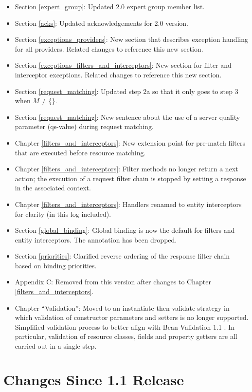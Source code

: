 \begin{itemize}
\item Section \ref{expert_group}: Updated 2.0 expert group member list.
\item Section \ref{acks}: Updated acknowledgements for 2.0 version.
\item Section \ref{exceptions_providers}: New section that describes exception handling for all providers. Related changes to reference this new section.
\item Section \ref{exceptions_filters_and_interceptors}: New section for filter and interceptor exceptions. Related changes to reference this new section.
\item Section \ref{request_matching}: Updated step 2a so that it only goes to step 3 when $M \neq \{\}$. 
\item Section \ref{request_matching}: New sentence about the use of a server quality parameter (qs-value) during request matching.
\item Chapter \ref{filters_and_interceptors}: New extension point for pre-match filters that are executed before resource matching.
\item Chapter \ref{filters_and_interceptors}: Filter methods no longer return a next action; the execution of a request filter chain is stopped by setting a response in the associated context.
\item Chapter \ref{filters_and_interceptors}: Handlers renamed to entity interceptors for clarity (in this log included).
\item Section \ref{global_binding}: Global binding is now the default for filters and entity interceptors. The annotation  has been dropped.
\item Section \ref{priorities}: Clarified reverse ordering of the response filter chain based on binding priorities.
\item Appendix C: Removed from this version after changes to Chapter \ref{filters_and_interceptors}.
\item Chapter ``Validation'': Moved to an instantiate-then-validate strategy in which validation of constructor parameters and setters is no longer supported. Simplified validation process to better align with Bean Validation 1.1 \cite{bv11}. In particular, validation of resource classes, fields and property getters are all carried out in a single step.

\end{itemize}

\section{Changes Since 1.1 Release}

